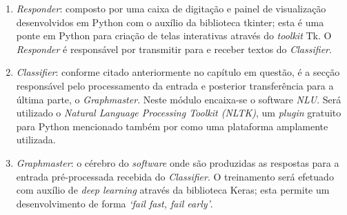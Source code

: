 \documentclass[
	12pt,				%
	oneside,
	a4paper,			%
	english,			%
	french,				%
	spanish,			%
	brazil				%
	]{abntex2}
\begin{document}
\begin{enumerate}
\item \emph{Responder}: composto por uma caixa de digitação e painel de visualização desenvolvidos em Python com o auxílio da biblioteca tkinter; esta é uma ponte em Python para criação de telas interativas através do \emph{toolkit} Tk. O \emph{Responder} é responsável por transmitir para e receber textos do \emph{Classifier}.
\item \emph{Classifier}: conforme citado anteriormente no capítulo em questão, é a secção responsável pelo processamento da entrada e posterior transferência para a última parte, o \emph{Graphmaster}. Neste módulo encaixa-se o software \emph{NLU}. Será utilizado o \emph{Natural Language Processing Toolkit (NLTK)}, um \emph{plugin} gratuito para Python mencionado também por \textcite{Abdul-Kader2015} como uma plataforma amplamente utilizada.
\item \emph{Graphmaster}: o cérebro do \emph{software} onde são produzidas as respostas para a entrada pré-processada recebida do \emph{Classifier}. O treinamento será efetuado com auxílio de \emph{deep learning} através da biblioteca Keras; esta permite um desenvolvimento de forma \emph{‘fail fast, fail early’}.
\end{enumerate}
\end{document}
